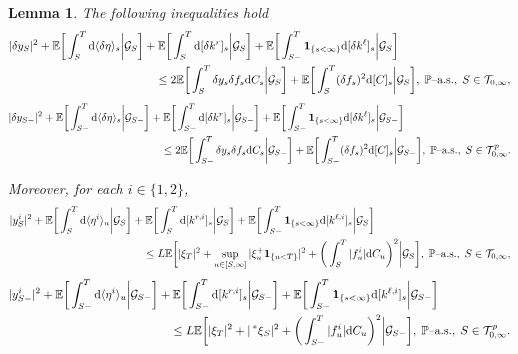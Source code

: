\documentclass[10pt]{article} %
\newtheorem{lemma}[theorem]{Lemma}
\newcommand\cG{\mathcal G}
\newcommand\cT{\mathcal T}
\def \E{\mathbb{E}}
\def \P{\mathbb{P}}
\newcommand{\brs}[1]{\prescript{\ast}{}{#1}}
\newcommand{\1}{\mathbf{1}}
\def\d{\mathrm{d}}
\begin{document}
\begin{lemma}\label{lem::cond_estimates}
	The following inequalities hold
		\begin{align}\label{eq::cond_deltaeta0}
			|\delta y_S|^2 + \E\bigg[\int_S^T \d\langle\delta\eta\rangle_s \bigg| \cG_S\bigg] &+ \E\bigg[\int_S^T \d[\delta k^r]_s \bigg| \cG_S\bigg] + \E\bigg[\int_{S-}^T \mathbf{1}_{\{s < \infty\}} \d[\delta k^\ell]_s \bigg| \cG_S\bigg] \nonumber\\
	&\quad \leq 2 \E\bigg[\int_S^T \delta y_s \delta f_s \d C_s \bigg| \cG_S\bigg] + \E\bigg[\int_S^T (\delta f_s)^2\d[C]_s \bigg| \cG_S\bigg],\; \text{$\P$\rm--a.s.}, \; S \in \cT_{0,\infty},
		\end{align}
		\begin{align}\label{eq::cond_deltaeta_pred0}
			|\delta y_{S-}|^2 + \E\bigg[\int_{S-}^T \d\langle\delta\eta\rangle_s \bigg| \cG_{S-}\bigg] &+ \E\bigg[\int_{S-}^T \d[\delta k^r]_s \bigg| \cG_{S-}\bigg] + \E\bigg[\int_{S-}^T \mathbf{1}_{\{s < \infty\}} \d[\delta k^\ell]_s \bigg| \cG_{S-}\bigg] \nonumber\\
	&\quad \leq 2 \E\bigg[\int_{S-}^T \delta y_s \delta f_s \d C_s \bigg| \cG_{S-}\bigg] + \E\bigg[\int_{S-}^T (\delta f_s)^2\d[C]_s \bigg| \cG_{S-}\bigg],\; \text{$\P$\rm--a.s.}, \; S \in \cT^p_{0,\infty}.
		\end{align}
		
		Moreover, for each $i \in \{1,2\}$,
		\begin{align}\label{eq::cond_eta1}
			 |y^i_S|^2 + \E\bigg[ \int_S^T \d \langle \eta^i \rangle_u \bigg| \cG_S \bigg] &+ \E\bigg[\int_S^T \d[k^{r,i}]_s \bigg| \cG_S\bigg] + \E\bigg[\int_{S-}^T \mathbf{1}_{\{s < \infty\}} \d[k^{\ell,i}]_s \bigg| \cG_S\bigg] \nonumber\\
			 &\quad\leq L \E\bigg[ |\xi_T|^2 + \sup_{u \in [S,\infty]} |\xi^+_u \mathbf{1}_{\{u < T\}}|^2 + \bigg(\int_S^T |f^i_u| \d C_u\bigg)^2 \bigg| \cG_S \bigg],\; \text{$\P$\rm--a.s.}, \; S \in \cT_{0,\infty},
		\end{align}
		\begin{align}\label{eq::cond_eta1_pred}
			 |y^i_{S-}|^2 + \E\bigg[ \int_{S-}^T \d \langle \eta^i \rangle_u \bigg| \cG_{S-} \bigg] &+ \E\bigg[\int_{S-}^T \d[k^{r,i}]_s \bigg| \cG_{S-}\bigg] + \E\bigg[\int_{S-}^T \mathbf{1}_{\{s < \infty\}} \d[k^{\ell,i}]_s \bigg| \cG_{S-}\bigg] \nonumber\\
			 &\quad\leq L \E\bigg[ |\xi_T|^2 + |\brs{\xi}_S|^2 + \bigg(\int_{S-}^T |f^i_u| \d C_u\bigg)^2 \bigg| \cG_{S-} \bigg],\; \text{$\P$\rm--a.s.}, \; S \in \cT^p_{0,\infty}.
		\end{align}
\end{lemma}
\end{document}

